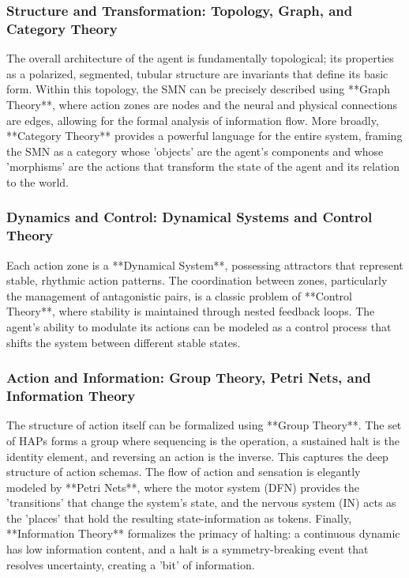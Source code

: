 \subsubsection{Structure and Transformation: Topology, Graph, and Category Theory}
\label{ssubsec:formal_structure}
The overall architecture of the agent is fundamentally topological; its properties as a polarized, segmented, tubular structure are invariants that define its basic form. Within this topology, the SMN can be precisely described using **Graph Theory**, where action zones are nodes and the neural and physical connections are edges, allowing for the formal analysis of information flow. More broadly, **Category Theory** provides a powerful language for the entire system, framing the SMN as a category whose 'objects' are the agent's components and whose 'morphisms' are the actions that transform the state of the agent and its relation to the world.

\subsubsection{Dynamics and Control: Dynamical Systems and Control Theory}
\label{ssubsec:formal_dynamics}
Each action zone is a **Dynamical System**, possessing attractors that represent stable, rhythmic action patterns. The coordination between zones, particularly the management of antagonistic pairs, is a classic problem of **Control Theory**, where stability is maintained through nested feedback loops. The agent's ability to modulate its actions can be modeled as a control process that shifts the system between different stable states.

\subsubsection{Action and Information: Group Theory, Petri Nets, and Information Theory}
\label{ssubsec:formal_action}
The structure of action itself can be formalized using **Group Theory**. The set of HAPs forms a group where sequencing is the operation, a sustained halt is the identity element, and reversing an action is the inverse. This captures the deep structure of action schemas. The flow of action and sensation is elegantly modeled by **Petri Nets**, where the motor system (DFN) provides the 'transitions' that change the system's state, and the nervous system (IN) acts as the 'places' that hold the resulting state-information as tokens. Finally, **Information Theory** formalizes the primacy of halting: a continuous dynamic has low information content, and a halt is a symmetry-breaking event that resolves uncertainty, creating a 'bit' of information.

